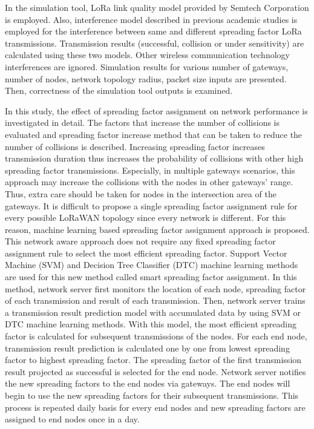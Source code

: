 In the simulation tool, LoRa link quality model provided by Semtech Corporation is employed. Also, interference model described in previous academic studies is employed for the interference between same and different spreading factor LoRa transmissions. Transmission results (successful, collision or under sensitivity) are calculated using these two models. Other wireless communication technology interferences are ignored. Simulation results for various number of gateways, number of nodes, network topology radius, packet size inputs are presented. Then, correctness of the simulation tool outputs is examined.

In this study, the effect of spreading factor assignment on network performance is investigated in detail. The factors that increase the number of collisions is evaluated and spreading factor increase method that can be taken to reduce the number of collisions is described. Increasing spreading factor increases transmission duration thus increases the probability of collisions with other high spreading factor transmissions. Especially, in multiple gateways scenarios, this approach may increase the collisions with the nodes in other gateways’ range. Thus, extra care should be taken for nodes in the intersection area of the gateways. It is difficult to propose a single spreading factor assignment rule for every possible LoRaWAN topology since every network is different. For this reason, machine learning based spreading factor assignment approach is proposed. This network aware approach does not require any fixed spreading factor assignment rule to select the most efficient spreading factor. Support Vector Machine (SVM) and Decision Tree Classifier (DTC) machine learning methods are used for this new method called smart spreading factor assignment. In this method, network server first monitors the location of each node, spreading factor of each transmission and result of each transmission. Then, network server trains a transmission result prediction model with accumulated data by using SVM or DTC machine learning methods. With this model, the most efficient spreading factor is calculated for subsequent transmissions of the nodes. For each end node, transmission result prediction is calculated one by one from lowest spreading factor to highest spreading factor. The spreading factor of the first transmission result projected as successful is selected for the end node. Network server notifies the new spreading factors to the end nodes via gateways. The end nodes will begin to use the new spreading factors for their subsequent transmissions. This process is repeated daily basis for every end nodes and new spreading factors are assigned to end nodes once in a day.

